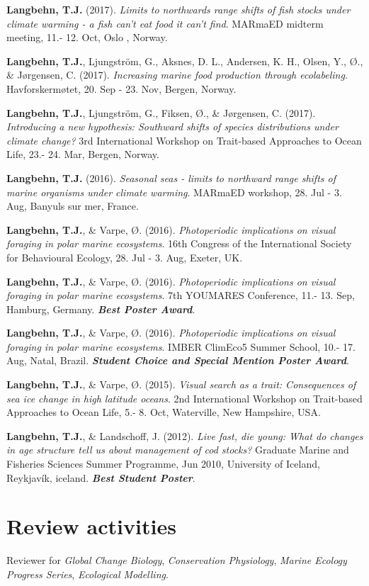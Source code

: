 \documentclass[11pt, a4paper]{awesome-cv}
\begin{document}
\leavevmode\hypertarget{ref-Langbehn9}{}%
\textbf{Langbehn, T.J.} (2017). \emph{Limits to northwards range shifts
of fish stocks under climate warming - a fish can't eat food it can't
find}. MARmaED midterm meeting, 11.- 12. Oct, Oslo , Norway.

\leavevmode\hypertarget{ref-Langbehn8}{}%
\textbf{Langbehn, T.J.}, Ljungström, G., Aksnes, D. L., Andersen, K. H.,
Olsen, Y., Ø., \& Jørgensen, C. (2017). \emph{Increasing marine food
production through ecolabeling}. Havforskermøtet, 20. Sep - 23. Nov,
Bergen, Norway.

\leavevmode\hypertarget{ref-Langbehn7}{}%
\textbf{Langbehn, T.J.}, Ljungström, G., Fiksen, Ø., \& Jørgensen, C.
(2017). \emph{Introducing a new hypothesis: Southward shifts of species
distributions under climate change?} 3rd International Workshop on
Trait-based Approaches to Ocean Life, 23.- 24. Mar, Bergen, Norway.

\leavevmode\hypertarget{ref-Langbehn3}{}%
\textbf{Langbehn, T.J.} (2016). \emph{Seasonal seas - limits to
northward range shifts of marine organisms under climate warming}.
MARmaED workshop, 28. Jul - 3. Aug, Banyuls sur mer, France.

\leavevmode\hypertarget{ref-Langbehn4}{}%
\textbf{Langbehn, T.J.}, \& Varpe, Ø. (2016). \emph{Photoperiodic
implications on visual foraging in polar marine ecosystems}. 16th
Congress of the International Society for Behavioural Ecology, 28. Jul -
3. Aug, Exeter, UK.

\leavevmode\hypertarget{ref-Langbehn5}{}%
\textbf{Langbehn, T.J.}, \& Varpe, Ø. (2016). \emph{Photoperiodic
implications on visual foraging in polar marine ecosystems}. 7th
YOUMARES Conference, 11.- 13. Sep, Hamburg, Germany. \emph{\textbf{Best
Poster Award}}.

\leavevmode\hypertarget{ref-Langbehn6}{}%
\textbf{Langbehn, T.J.}, \& Varpe, Ø. (2016). \emph{Photoperiodic
implications on visual foraging in polar marine ecosystems}. IMBER
ClimEco5 Summer School, 10.- 17. Aug, Natal, Brazil.
\emph{\textbf{Student Choice and Special Mention Poster Award}}.

\leavevmode\hypertarget{ref-Langbehn2}{}%
\textbf{Langbehn, T.J.}, \& Varpe, Ø. (2015). \emph{Visual search as a
trait: Consequences of sea ice change in high latitude oceans}. 2nd
International Workshop on Trait-based Approaches to Ocean Life, 5.- 8.
Oct, Waterville, New Hampshire, USA.

\leavevmode\hypertarget{ref-Langbehn1}{}%
\textbf{Langbehn, T.J.}, \& Landschoff, J. (2012). \emph{Live fast, die
young: What do changes in age structure tell us about management of cod
stocks?} Graduate Marine and Fisheries Sciences Summer Programme, Jun
2010, University of Iceland, Reykjavík, iceland. \emph{\textbf{Best
Student Poster}}.

\endgroup

\hypertarget{review-activities}{%
\section{Review activities}\label{review-activities}}

Reviewer for \emph{Global Change Biology}, \emph{Conservation
Physiology}, \emph{Marine Ecology Progress Series}, \emph{Ecological
Modelling}.
\end{document}
